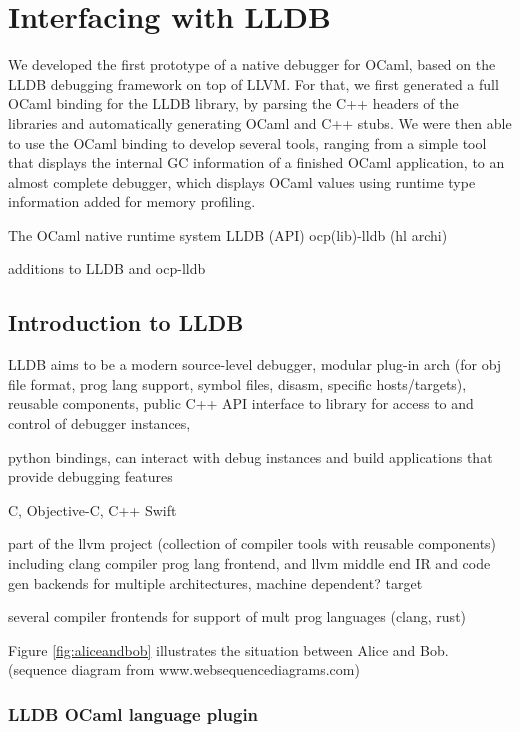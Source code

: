 \chapter{Interfacing with LLDB\label{cha:chapter4}}


We developed the first prototype of a native debugger for OCaml, based on the LLDB debugging framework on top of LLVM. For that, we first generated a full OCaml binding for the LLDB library, by parsing the C++ headers of the libraries and automatically generating OCaml and C++ stubs. We were then able to use the OCaml binding to develop several tools, ranging from a simple tool that displays the internal GC information of a finished OCaml application, to an almost complete debugger, which displays OCaml values using runtime type information added for memory profiling.

The OCaml native runtime system
LLDB (API)
ocp(lib)-lldb (hl archi)

additions to LLDB and ocp-lldb

\section{Introduction to LLDB}

LLDB\autocite{lldb}
aims to be a modern source-level debugger, modular plug-in arch (for obj file
format, prog lang support, symbol files, disasm, specific hosts/targets), reusable components, public
C++ API interface to library for access to and control of debugger instances,

python bindings,
can interact with debug instances and build applications that provide debugging features

 C, Objective-C, C++ Swift

part of the llvm project (collection of compiler tools with reusable components)
including clang compiler prog lang frontend, and llvm middle end IR and code gen backends
for multiple architectures, machine dependent? target

several compiler frontends for support of mult prog languages (clang, rust)


Figure \ref{fig:aliceandbob} illustrates the situation between Alice and Bob. (sequence diagram from www.websequencediagrams.com)


\subsection{LLDB OCaml language plugin}

